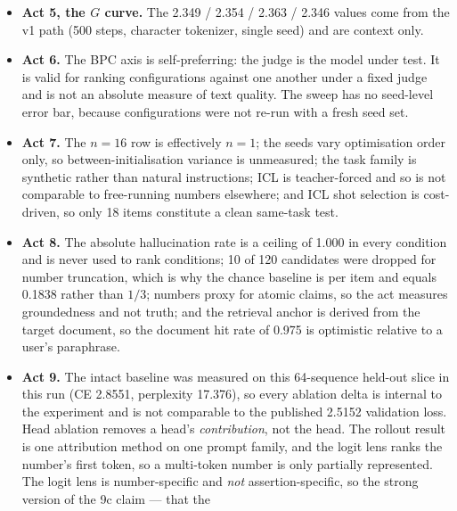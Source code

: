 \documentclass[11pt,a4paper]{article}
\begin{document}
\begin{itemize}
      the residual-correction argument. The zero-gap total-variation comparison
      is near-tautological --- at zero gap speculative decoding \emph{is} plain
      sampling --- and so proves that the code runs, not that the operator is
      correct on a real model.
\item \textbf{Act 5, the $G$ curve.} The 2.349 / 2.354 / 2.363 / 2.346 values
      come from the v1 path (500 steps, character tokenizer, single seed) and
      are context only.
\item \textbf{Act 6.} The BPC axis is self-preferring: the judge is the model
      under test. It is valid for ranking configurations against one another
      under a fixed judge and is not an absolute measure of text quality. The
      sweep has no seed-level error bar, because configurations were not
      re-run with a fresh seed set.
\item \textbf{Act 7.} The $n = 16$ row is effectively $n = 1$; the seeds vary
      optimisation order only, so between-initialisation variance is
      unmeasured; the task family is synthetic rather than natural
      instructions; ICL is teacher-forced and so is not comparable to
      free-running numbers elsewhere; and ICL shot selection is cost-driven, so
      only 18 items constitute a clean same-task test.
\item \textbf{Act 8.} The absolute hallucination rate is a ceiling of 1.000 in
      every condition and is never used to rank conditions; 10 of 120
      candidates were dropped for number truncation, which is why the chance
      baseline is per item and equals 0.1838 rather than $1/3$; numbers proxy
      for atomic claims, so the act measures groundedness and not truth; and
      the retrieval anchor is derived from the target document, so the document
      hit rate of 0.975 is optimistic relative to a user's paraphrase.
\item \textbf{Act 9.} The intact baseline was measured on this
      64-sequence held-out slice in this run (CE 2.8551, perplexity 17.376),
      so every ablation delta is internal to the experiment and is not
      comparable to the published 2.5152 validation loss. Head ablation
      removes a head's \emph{contribution}, not the head. The rollout result
      is one attribution method on one prompt family, and the logit lens ranks
      the number's first token, so a multi-token number is only partially
      represented. The logit lens is number-specific and \emph{not}
      assertion-specific, so the strong version of the 9c claim --- that the

\end{itemize}
\end{document}
